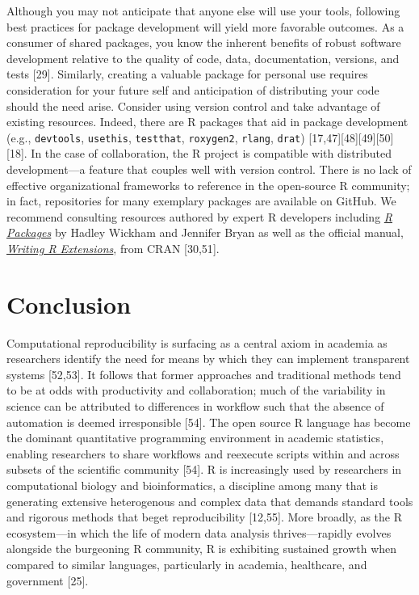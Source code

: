 \documentclass[10pt,letterpaper]{article}
\begin{document}
Although you may not anticipate that anyone else will use your tools,
following best practices for package development will yield more
favorable outcomes. As a consumer of shared packages, you know the
inherent benefits of robust software development relative to the quality
of code, data, documentation, versions, and tests {[}29{]}. Similarly,
creating a valuable package for personal use requires consideration for
your future self and anticipation of distributing your code should the
need arise. Consider using version control and take advantage of
existing resources. Indeed, there are R packages that aid in package
development (e.g., \texttt{devtools}, \texttt{usethis},
\texttt{testthat}, \texttt{roxygen2}, \texttt{rlang}, \texttt{drat})
{[}17,47{]}{[}48{]}{[}49{]}{[}50{]}{[}18{]}. In the case of
collaboration, the R project is compatible with distributed
development---a feature that couples well with version control. There is
no lack of effective organizational frameworks to reference in the
open-source R community; in fact, repositories for many exemplary
packages are available on GitHub. We recommend consulting resources
authored by expert R developers including
\href{https://r-pkgs.org/}{\emph{R Packages}} by Hadley Wickham and
Jennifer Bryan as well as the official manual,
\href{https://cran.r-project.org/doc/manuals/r-release/R-exts.html}{\emph{Writing
R Extensions}}, from CRAN {[}30,51{]}.

\hypertarget{conclusion}{%
\section{Conclusion}\label{conclusion}}

Computational reproducibility is surfacing as a central axiom in
academia as researchers identify the need for means by which they can
implement transparent systems {[}52,53{]}. It follows that former
approaches and traditional methods tend to be at odds with productivity
and collaboration; much of the variability in science can be attributed
to differences in workflow such that the absence of automation is deemed
irresponsible {[}54{]}. The open source R language has become the
dominant quantitative programming environment in academic statistics,
enabling researchers to share workflows and reexecute scripts within and
across subsets of the scientific community {[}54{]}. R is increasingly
used by researchers in computational biology and bioinformatics, a
discipline among many that is generating extensive heterogenous and
complex data that demands standard tools and rigorous methods that beget
reproducibility {[}12,55{]}. More broadly, as the R ecosystem---in which
the life of modern data analysis thrives---rapidly evolves alongside the
burgeoning R community, R is exhibiting sustained growth when compared
to similar languages, particularly in academia, healthcare, and
government {[}25{]}.
\end{document}
